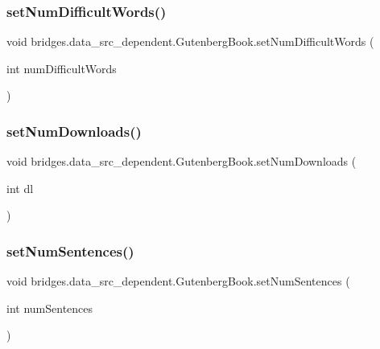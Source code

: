 \subsubsection{\texorpdfstring{set\+Num\+Difficult\+Words()}{setNumDifficultWords()}}
{\footnotesize\ttfamily void bridges.\+data\+\_\+src\+\_\+dependent.\+Gutenberg\+Book.\+set\+Num\+Difficult\+Words (\begin{DoxyParamCaption}\item[{int}]{num\+Difficult\+Words }\end{DoxyParamCaption})}

\hypertarget{classbridges_1_1data__src__dependent_1_1_gutenberg_book_aa871c9aa9a34d7de8409c1c0f24c3dbe}{}\label{classbridges_1_1data__src__dependent_1_1_gutenberg_book_aa871c9aa9a34d7de8409c1c0f24c3dbe} 
\subsubsection{\texorpdfstring{set\+Num\+Downloads()}{setNumDownloads()}}
{\footnotesize\ttfamily void bridges.\+data\+\_\+src\+\_\+dependent.\+Gutenberg\+Book.\+set\+Num\+Downloads (\begin{DoxyParamCaption}\item[{int}]{dl }\end{DoxyParamCaption})}

\hypertarget{classbridges_1_1data__src__dependent_1_1_gutenberg_book_a3690d6d74f3f47aa8a0fbc4d57f3102a}{}\label{classbridges_1_1data__src__dependent_1_1_gutenberg_book_a3690d6d74f3f47aa8a0fbc4d57f3102a} 
\subsubsection{\texorpdfstring{set\+Num\+Sentences()}{setNumSentences()}}
{\footnotesize\ttfamily void bridges.\+data\+\_\+src\+\_\+dependent.\+Gutenberg\+Book.\+set\+Num\+Sentences (\begin{DoxyParamCaption}\item[{int}]{num\+Sentences }\end{DoxyParamCaption})}

